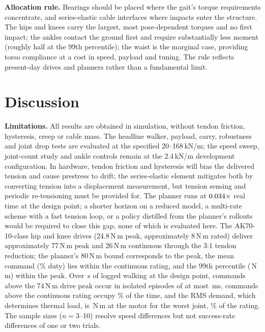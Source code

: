 \documentclass[letterpaper, 10pt, conference]{ieeeconf}
\begin{document}
\textbf{Allocation rule.} Bearings should be placed where the gait's torque requirements
concentrate, and series-elastic cable interfaces where impacts enter the
structure. The hips and knees carry the largest, most pose-dependent
torques and no first impact; the ankles contact the ground first and require substantially less
moment (roughly half at the 99th percentile); the waist is the marginal case,
providing torso compliance at a cost in speed, payload and tuning. The rule reflects present-day drives and planners rather than a
fundamental limit.

\section{Discussion}
\label{sec:discussion}
\textbf{Limitations.} All results are obtained in simulation, without
tendon friction, hysteresis, creep or cable mass. The headline walker,
payload, carry, robustness and joint drop tests are evaluated at the
specified 20--168\,kN/m; the speed sweep, joint-count study and ankle
controls remain at the 2.4\,kN/m development configuration. In hardware, tendon friction and hysteresis will bias the delivered
tension and cause prestress to drift; the series-elastic element mitigates
both by converting tension into a displacement measurement, but tension
sensing and periodic re-tensioning must be provided for. The planner runs at $0.034\times$ real
time at the design point; a shorter horizon on a reduced model, a
multi-rate scheme with a fast tension loop, or a policy distilled from the
planner's rollouts would be required to close this gap, none of which is
evaluated here. The AK70-10-class hip
and knee drives (24.8\,N\,m peak, approximately 8\,N\,m rated) deliver
approximately 77\,N\,m peak and 26\,N\,m continuous through the 3:1 tendon
reduction; the planner's 80\,N\,m bound corresponds to the peak, the mean
command (\headLegDuty\% duty) lies within the continuous rating, and the
99th percentile (\headLegNmPeak\,N\,m) within the peak. Over
\headTorqueWalkSeconds\,s of logged walking at the design point, commands
above the 74\,N\,m drive peak occur in \headTorqueOverPeakEpisodes{}
isolated episodes of at most \headTorqueOverPeakMaxMs\,ms, commands above
the continuous rating occupy \headTorqueOverContPct\% of the time, and the
RMS demand, which determines thermal load, is \headMotorRmsNm\,N\,m at the
motor for the worst joint, \headMotorRmsPct\% of the rating. The sample sizes ($n=3$--10) resolve speed differences but not
success-rate differences of one or two trials.
\end{document}
